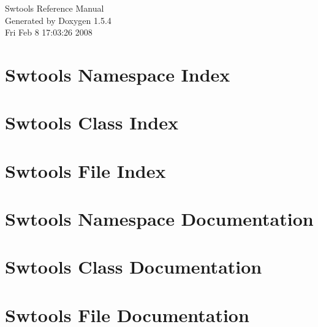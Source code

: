 \documentclass[a4paper]{book}
\begin{document}
\begin{titlepage}
\vspace*{7cm}
\begin{center}
{\Large Swtools Reference Manual}\\
\vspace*{1cm}
{\large Generated by Doxygen 1.5.4}\\
\vspace*{0.5cm}
{\small Fri Feb 8 17:03:26 2008}\\
\end{center}
\end{titlepage}
\clearemptydoublepage
{}
\tableofcontents
\clearemptydoublepage
{}
\chapter{Swtools Namespace Index}

\chapter{Swtools Class Index}

\chapter{Swtools File Index}

\chapter{Swtools Namespace Documentation}


















\chapter{Swtools Class Documentation}


\chapter{Swtools File Documentation}


















\printindex
\end{document}
